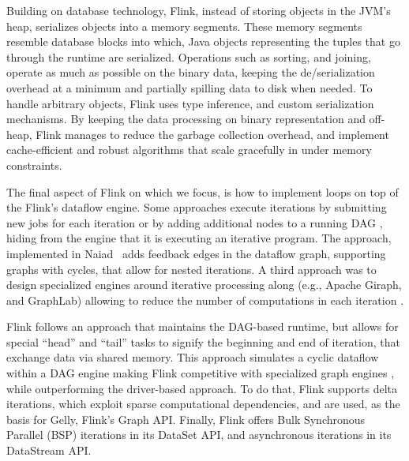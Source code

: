  Building on database technology, Flink, instead of storing objects in the JVM's heap, serializes objects into a  memory segments. These memory segments resemble database blocks into which, Java objects representing the tuples that go through the runtime are serialized. Operations such as sorting, and joining, operate as much as possible on the binary data, keeping the de/serialization overhead at a minimum and partially spilling data to disk when needed. To handle arbitrary objects, Flink uses type inference, and  custom serialization mechanisms.  By keeping the data processing on binary representation and off-heap, Flink manages to reduce the garbage collection overhead, and implement cache-efficient and robust algorithms that scale gracefully in under memory constraints.

 The final aspect of Flink on which we focus, is how to implement loops on top of the Flink's dataflow engine. Some approaches execute iterations by submitting new jobs for each iteration or by adding additional nodes to a running DAG \cite{DBLP:journals/pvldb/BuHBE10, DBLP:conf/hotcloud/ZahariaCFSS10}, hiding from  the engine that it is executing an iterative program. The approach, implemented in Naiad~\cite{murray2013naiad} adds feedback edges in the dataflow graph, supporting graphs with cycles, that  allow for nested iterations. A third approach was to design specialized engines around iterative processing along (e.g., Apache Giraph, and GraphLab) allowing to reduce the number of computations in each iteration \cite{low2012distributed}.

Flink follows an approach that maintains the DAG-based runtime, but allows for special ``head'' and ``tail'' tasks to signify the beginning and end of iteration, that exchange data via shared memory. This approach simulates a cyclic dataflow within a DAG engine making Flink competitive with specialized graph engines \cite{DBLP:journals/pvldb/EwenTKM12}, while outperforming the driver-based approach. To do that, Flink supports delta iterations, which exploit sparse computational dependencies, and are used, as the basis for Gelly, Flink's Graph API. Finally, Flink offers Bulk Synchronous Parallel (BSP) iterations in its DataSet API, and asynchronous iterations in its DataStream API.
